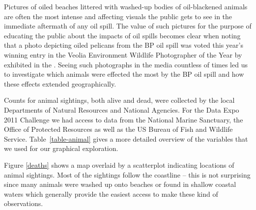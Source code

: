 \documentclass[authoryear,12pt]{elsarticle}
\begin{document}
{Pictures of oiled beaches littered with washed-up bodies of oil-blackened animals are often} the most {intense} and {affecting visuals the public gets to see} {in the immediate aftermath of any oil spill}. {The value of such pictures for the purpose of educating the public about the impacts of oil spills becomes clear when noting that a photo depicting oiled pelicans from the BP oil spill was voted} this year's winning entry in the Veolia Environment Wildlife Photographer of the Year by \citet{photo} {exhibited in the \citet{exhibition}}. {Seeing such photographs in the media countless of times led us to investigate which animals were effected the most by the BP oil spill and how these effects extended geographically.}



Counts for animal sightings, both alive and dead, {were} collected by the local Departments of Natural Resources and National Agencies. For the Data Expo 2011 Challenge we had access to data from the National Marine Sanctuary, the Office of Protected Resources as well as the US Bureau of Fish and Wildlife Service. Table~\ref{table-animal} gives a more detailed overview of the variables that we used for our graphical exploration. 

Figure \ref{deaths} shows a map overlaid by a scatterplot indicating locations of animal sightings. Most of the sightings follow the coastline  {-- this} is not surprising since  {many animals were washed up onto beaches or found in shallow coastal waters which generally provide} the easiest access to make these kind of observations. 

%
%
\end{document}
